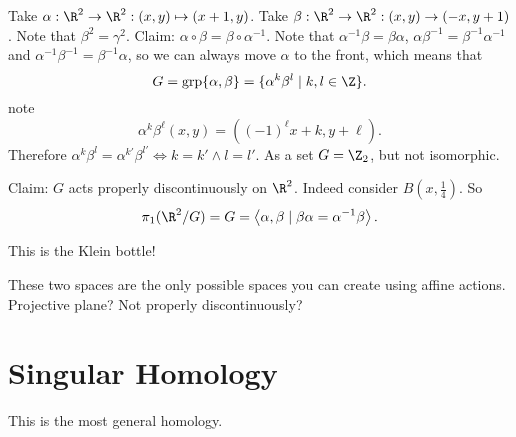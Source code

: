 \begin{eg}
    Take $\alpha: \R^2 \to  \R^2: (x, y) \mapsto (x +1, y)$.
    Take $\beta: \R^2 \to  \R^2: (x, y) \to  (-x, y+1)$.
    Note that $\beta^2 = \gamma^2$.
    Claim: $\alpha  \circ  \beta = \beta  \circ  \alpha ^{-1}$.
    Note that $\alpha^{-1} \beta = \beta \alpha$, $\alpha \beta^{-1} = \beta^{-1} \alpha^{-1}$ and $\alpha^{-1} \beta^{-1} = \beta^{-1} \alpha$, so we can always move $\alpha$ to the front, which means that
    \[
        G = \operatorname{grp} \{\alpha, \beta\}  = \{\alpha ^{k} \beta^{l}  \mid  k, l \in \Z\} .\]
        note
        \[
            \alpha ^{k} \beta^{\ell}(x, y) = ((-1)^{\ell} x + k, y + \ell)
        .\]
        Therefore $\alpha ^{k} \beta^{l} = \alpha ^{k'} \beta^{ l'} \iff k = k' \land l = l'$.
        As a set $G = \Z_2$, but not isomorphic.

        Claim: $G$ acts properly discontinuously on $\R^2$. Indeed consider $B(x, \frac{1}{4})$.
        So \[
            \pi_1 ( \R^2 / G) = G = \left<\alpha, \beta  \mid  \beta \alpha = \alpha^{-1} \beta \right>
        .\]

        \begin{figure}[H]
            \centering
            \label{fig:example-covering-fundamental-group}
        \end{figure}

        This is the Klein bottle!
\end{eg}
\begin{remark}
    These two spaces are the only possible spaces you can create using affine actions.
    Projective plane? Not properly discontinuously?
\end{remark}



\chapter{Singular Homology}

This is the most general homology.

